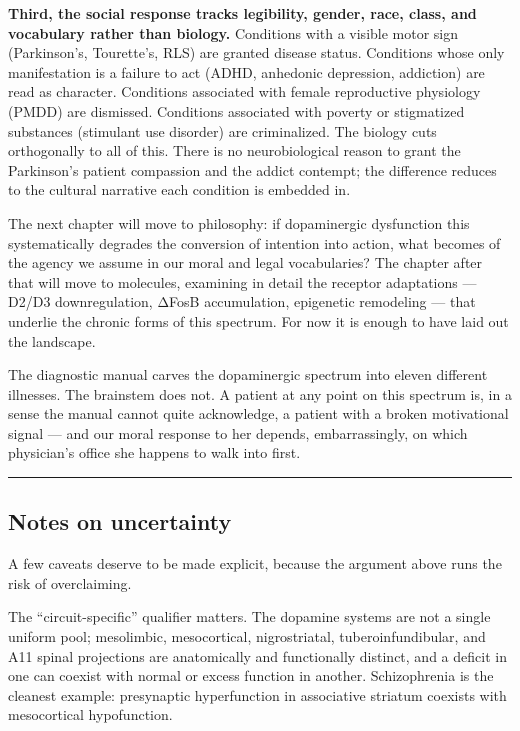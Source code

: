 \textbf{Third, the social response tracks legibility, gender, race, class, and vocabulary rather than biology.} Conditions with a visible motor sign (Parkinson's, Tourette's, RLS) are granted disease status. Conditions whose only manifestation is a failure to act (ADHD, anhedonic depression, addiction) are read as character. Conditions associated with female reproductive physiology (PMDD) are dismissed. Conditions associated with poverty or stigmatized substances (stimulant use disorder) are criminalized. The biology cuts orthogonally to all of this. There is no neurobiological reason to grant the Parkinson's patient compassion and the addict contempt; the difference reduces to the cultural narrative each condition is embedded in.

The next chapter will move to philosophy: if dopaminergic dysfunction this systematically degrades the conversion of intention into action, what becomes of the agency we assume in our moral and legal vocabularies? The chapter after that will move to molecules, examining in detail the receptor adaptations --- D2/D3 downregulation, ΔFosB accumulation, epigenetic remodeling --- that underlie the chronic forms of this spectrum. For now it is enough to have laid out the landscape.

The diagnostic manual carves the dopaminergic spectrum into eleven different illnesses. The brainstem does not. A patient at any point on this spectrum is, in a sense the manual cannot quite acknowledge, a patient with a broken motivational signal --- and our moral response to her depends, embarrassingly, on which physician's office she happens to walk into first.

\begin{center}\rule{0.5\linewidth}{0.5pt}\end{center}

\subsection{Notes on uncertainty}\label{09_dopamine_spectrum-notes-on-uncertainty}

A few caveats deserve to be made explicit, because the argument above runs the risk of overclaiming.

The ``circuit-specific'' qualifier matters. The dopamine systems are not a single uniform pool; mesolimbic, mesocortical, nigrostriatal, tuberoinfundibular, and A11 spinal projections are anatomically and functionally distinct, and a deficit in one can coexist with normal or excess function in another. Schizophrenia is the cleanest example: presynaptic hyperfunction in associative striatum coexists with mesocortical hypofunction.

